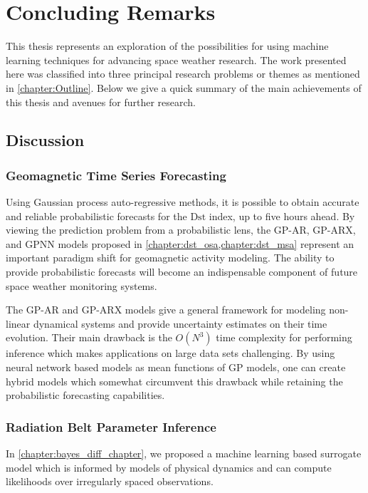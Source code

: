 \chapter{Concluding Remarks}\label{chapter:conclusions}

This thesis represents an exploration of the possibilities for using machine 
learning techniques for advancing space weather research. The work presented 
here was classified into three principal research problems or themes as 
mentioned in \cref{chapter:Outline}. Below we give a quick summary of the main 
achievements of this thesis and avenues for further research.

\section{Discussion}

\subsection*{Geomagnetic Time Series Forecasting}

Using Gaussian process auto-regressive methods, it is possible to obtain 
accurate and reliable probabilistic forecasts for the $\mathrm{Dst}$ index, 
up to five hours ahead. By viewing the prediction problem from a probabilistic 
lens, the GP-AR, GP-ARX, and GPNN models proposed in 
\cref{chapter:dst_osa,chapter:dst_msa} represent an important paradigm shift 
for geomagnetic activity modeling. The ability to provide probabilistic 
forecasts will become an indispensable component of future space weather 
monitoring systems.  

The GP-AR and GP-ARX models give a general framework for modeling non-linear 
dynamical systems and provide uncertainty estimates on their time evolution. 
Their main drawback is the $O(N^3)$ time complexity for performing inference 
which makes applications on large data sets challenging. By using neural 
network based models as mean functions of GP models, one can create hybrid 
models which somewhat circumvent this drawback while retaining the 
probabilistic forecasting capabilities.

\subsection*{Radiation Belt Parameter Inference}

In \cref{chapter:bayes_diff_chapter}, we proposed a machine learning based 
surrogate model which is informed by models of physical dynamics and can 
compute likelihoods over irregularly spaced observations.  

